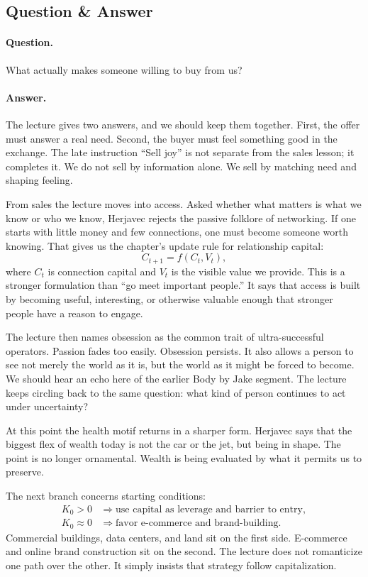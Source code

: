 \subsection{Question \& Answer}

\paragraph{Question.} What actually makes someone willing to buy from us?

\paragraph{Answer.} The lecture gives two answers, and we should keep them together. First, the offer must answer a real need. Second, the buyer must feel something good in the exchange. The late instruction ``Sell joy'' is not separate from the sales lesson; it completes it. We do not sell by information alone. We sell by matching need and shaping feeling.

From sales the lecture moves into access. Asked whether what matters is what we know or who we know, Herjavec rejects the passive folklore of networking. If one starts with little money and few connections, one must become someone worth knowing. That gives us the chapter's update rule for relationship capital:
\begin{equation}
C_{t+1} = f(C_t,V_t),
\end{equation}
where \(C_t\) is connection capital and \(V_t\) is the visible value we provide. This is a stronger formulation than ``go meet important people.'' It says that access is built by becoming useful, interesting, or otherwise valuable enough that stronger people have a reason to engage.

The lecture then names obsession as the common trait of ultra-successful operators. Passion fades too easily. Obsession persists. It also allows a person to see not merely the world as it is, but the world as it might be forced to become. We should hear an echo here of the earlier Body by Jake segment. The lecture keeps circling back to the same question: what kind of person continues to act under uncertainty?

At this point the health motif returns in a sharper form. Herjavec says that the biggest flex of wealth today is not the car or the jet, but being in shape. The point is no longer ornamental. Wealth is being evaluated by what it permits us to preserve.

The next branch concerns starting conditions:
\begin{align}
K_0 > 0 &\Rightarrow \text{use capital as leverage and barrier to entry},\\
K_0 \approx 0 &\Rightarrow \text{favor e-commerce and brand-building}.
\end{align}
Commercial buildings, data centers, and land sit on the first side. E-commerce and online brand construction sit on the second. The lecture does not romanticize one path over the other. It simply insists that strategy follow capitalization.

